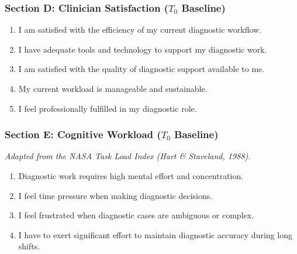 \subsubsection{Section D: Clinician Satisfaction ($T_0$ Baseline)}
\label{sec:pre_satisfaction}

\begin{enumerate}[label=\textbf{PS\arabic*.}]
    \item I am satisfied with the efficiency of my current diagnostic workflow. \hfill {}    
    \item I have adequate tools and technology to support my diagnostic work. \hfill {}    
    \item I am satisfied with the quality of diagnostic support available to me. \hfill {}    
    \item My current workload is manageable and sustainable. \hfill {}    
    \item I feel professionally fulfilled in my diagnostic role. \hfill {}    
\end{enumerate}

\subsubsection{Section E: Cognitive Workload ($T_0$ Baseline)}
\label{sec:pre_workload}

\noindent\textit{Adapted from the NASA Task Load Index (Hart \& Staveland, 1988).}

\begin{enumerate}[label=\textbf{PW\arabic*.}]
    \item Diagnostic work requires high mental effort and concentration. \hfill {}    
    \item I feel time pressure when making diagnostic decisions. \hfill {}    
    \item I feel frustrated when diagnostic cases are ambiguous or complex. \hfill {}    
    \item I have to exert significant effort to maintain diagnostic accuracy during long shifts. \hfill {}    
\end{enumerate}

